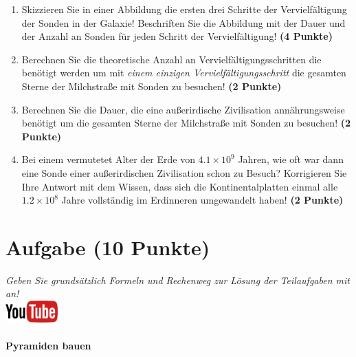 \documentclass[a4paper, 9pt]{scrartcl}\usepackage[]{graphicx}\usepackage[]{xcolor}
\begin{document}
\begin{enumerate}
\item Skizzieren Sie in einer Abbildung die ersten drei Schritte der
  Vervielf{\"a}ltigung der Sonden in der Galaxie! Beschriften Sie die Abbildung
  mit der Dauer und der Anzahl an Sonden f{\"u}r jeden Schritt der Vervielf{\"a}ltigung! \textbf{(4 Punkte)}
\item Berechnen Sie die theoretische Anzahl an Vervielf{\"a}ltigungsschritten die
  ben{\"o}tigt werden um mit \textit{einem einzigen Vervielf{\"a}ltigungsschritt} die
  gesamten Sterne der Milchstra{\ss}e mit Sonden zu besuchen! \textbf{(2 Punkte)}
\item Berechnen Sie die Dauer, die eine au{\ss}erirdische Zivilisation
  ann{\"a}hrungsweise ben{\"o}tigt um die gesamten Sterne der Milchstra{\ss}e mit
  Sonden zu besuchen! \textbf{(2 Punkte)}
\item Bei einem vermutetet Alter der Erde von $\ensuremath{4.1\times 10^{9}}$ Jahren,
  wie oft war dann eine Sonde einer au{\ss}erirdischen Zivilisation schon zu
  Besuch? Korrigieren Sie Ihre Antwort mit dem Wissen, dass sich die
  Kontinentalplatten einmal alle $\ensuremath{1.2\times 10^{8}}$ Jahre vollst{\"a}ndig im
  Erdinneren umgewandelt haben! \textbf{(2 Punkte)}
\end{enumerate}


 
\clearpage

\section{Aufgabe \hfill (10 Punkte)}

\textit{Geben Sie grunds{\"a}tzlich Formeln und Rechenweg zur L{\"o}sung der
  Teilaufgaben mit an!} \\[1Ex]

\hfill\href{https://youtu.be/tDgr6fpkkYA}{\includegraphics[width =
  2cm]{img/youtube}} %
\hspace{2Ex}

\paragraph{Pyramiden bauen}
\end{document}
